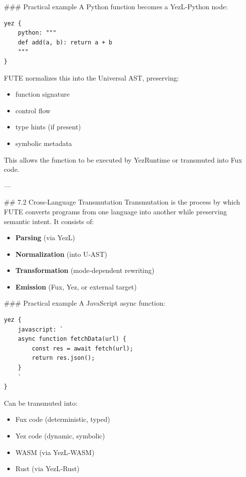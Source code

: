 \documentclass[12pt, a4paper]{book}
\begin{document}
\#\#\# Practical example  
A Python function becomes a YezL‑Python node:

\begin{lstlisting}[language=fuxyez]
yez {
    python: """
    def add(a, b): return a + b
    """
}

\end{lstlisting}

FUTE normalizes this into the Universal AST, preserving:

\begin{itemize}
  \item function signature  
  \item control flow  
  \item type hints (if present)  
  \item symbolic metadata  
\end{itemize}

This allows the function to be executed by YezRuntime or transmuted into Fux code.

---

\#\# 7.2 Cross‑Language Transmutation  
Transmutation is the process by which FUTE converts programs from one language into another while preserving semantic intent. It consists of:

\begin{itemize}
  \item \textbf{Parsing} (via YezL)  
  \item \textbf{Normalization} (into U‑AST)  
  \item \textbf{Transformation} (mode‑dependent rewriting)  
  \item \textbf{Emission} (Fux, Yez, or external target)  
\end{itemize}

\#\#\# Practical example  
A JavaScript async function:

\begin{lstlisting}[language=fuxyez]
yez {
    javascript: `
    async function fetchData(url) {
        const res = await fetch(url);
        return res.json();
    }
    `
}

\end{lstlisting}

Can be transmuted into:

\begin{itemize}
  \item Fux code (deterministic, typed)  
  \item Yez code (dynamic, symbolic)  
  \item WASM (via YezL‑WASM)  
  \item Rust (via YezL‑Rust)  
\end{itemize}
\end{document}
